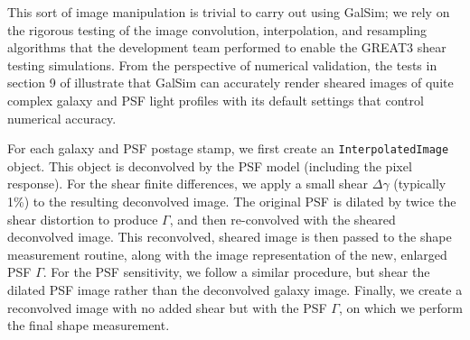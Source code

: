 \documentclass[iop]{emulateapj}
\begin{document}
This sort of image manipulation is trivial to carry out using GalSim; 
we rely on the rigorous testing of the
image convolution, interpolation, and resampling algorithms that the
development team performed to enable the GREAT3 shear testing
simulations.  From the perspective of numerical validation, the tests
in section 9 of \cite{2015A&C....10..121R} illustrate that GalSim can
accurately render sheared images of quite complex galaxy and PSF light
profiles with its default settings that control numerical accuracy.

For each galaxy and PSF postage stamp, we first create an \texttt{InterpolatedImage} object. This
object is deconvolved by the PSF model (including 
the pixel response). For the shear finite differences, we apply a
small shear $\Delta\gamma$ (typically 1\%) to the resulting
deconvolved image. The original PSF is dilated by twice the shear
distortion to produce $\Gamma$, and then re-convolved with the sheared deconvolved
image. This reconvolved, sheared image is then passed to the shape
measurement routine, along with the image representation of the new, enlarged PSF $\Gamma$. For the PSF
sensitivity, we follow a similar procedure, but shear the dilated PSF
image rather than the deconvolved galaxy image. Finally, we create a
reconvolved image with no added shear but with the PSF $\Gamma$, on which we perform the
final shape measurement.
\end{document}
